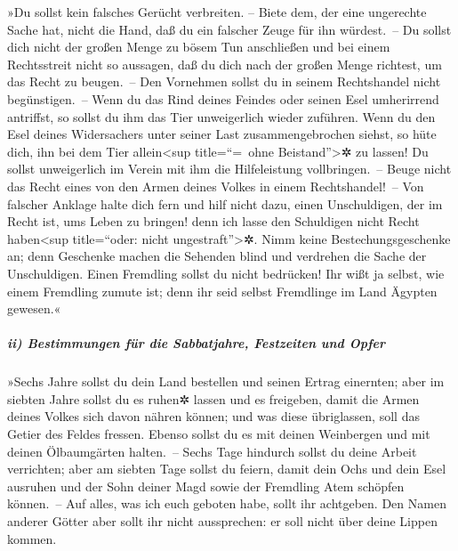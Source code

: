  »Du sollst kein falsches Gerücht verbreiten. -- Biete
dem, der eine ungerechte Sache hat, nicht die Hand, daß du ein falscher
Zeuge für ihn würdest.~--  Du sollst dich nicht der großen
Menge zu bösem Tun anschließen und bei einem Rechtsstreit nicht so
aussagen, daß du dich nach der großen Menge richtest, um das Recht zu
beugen.~--  Den Vornehmen sollst du in seinem Rechtshandel
nicht begünstigen.~--  Wenn du das Rind deines Feindes
oder seinen Esel umherirrend antriffst, so sollst du ihm das Tier
unweigerlich wieder zuführen.  Wenn du den Esel deines
Widersachers unter seiner Last zusammengebrochen siehst, so hüte dich,
ihn bei dem Tier allein\textless sup title=``=~ohne
Beistand''\textgreater✲ zu lassen! Du sollst unweigerlich im Verein mit
ihm die Hilfeleistung vollbringen.~--  Beuge nicht das
Recht eines von den Armen deines Volkes in einem Rechtshandel!~--
 Von falscher Anklage halte dich fern und hilf nicht dazu,
einen Unschuldigen, der im Recht ist, ums Leben zu bringen! denn ich
lasse den Schuldigen nicht Recht haben\textless sup title=``oder: nicht
ungestraft''\textgreater✲.  Nimm keine
Bestechungsgeschenke an; denn Geschenke machen die Sehenden blind und
verdrehen die Sache der Unschuldigen.  Einen Fremdling
sollst du nicht bedrücken! Ihr wißt ja selbst, wie einem Fremdling
zumute ist; denn ihr seid selbst Fremdlinge im Land Ägypten gewesen.«

\hypertarget{ii-bestimmungen-fuxfcr-die-sabbatjahre-festzeiten-und-opfer}{%
\subparagraph{ii) Bestimmungen für die Sabbatjahre, Festzeiten und
Opfer}\label{ii-bestimmungen-fuxfcr-die-sabbatjahre-festzeiten-und-opfer}}

 »Sechs Jahre sollst du dein Land bestellen und seinen
Ertrag einernten;  aber im siebten Jahre sollst du es
ruhen✲ lassen und es freigeben, damit die Armen deines Volkes sich davon
nähren können; und was diese übriglassen, soll das Getier des Feldes
fressen. Ebenso sollst du es mit deinen Weinbergen und mit deinen
Ölbaumgärten halten.~--  Sechs Tage hindurch sollst du
deine Arbeit verrichten; aber am siebten Tage sollst du feiern, damit
dein Ochs und dein Esel ausruhen und der Sohn deiner Magd sowie der
Fremdling Atem schöpfen können.~--  Auf alles, was ich
euch geboten habe, sollt ihr achtgeben. Den Namen anderer Götter aber
sollt ihr nicht aussprechen: er soll nicht über deine Lippen kommen.

